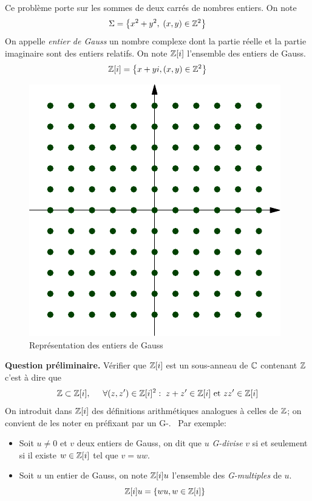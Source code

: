 Ce problème porte sur les sommes de deux carrés de nombres entiers. On note
\begin{displaymath}
  \Sigma = \left\lbrace x^2 + y^2,\; (x,y)\in \mathbb{Z}^2\right\rbrace 
\end{displaymath}
On appelle \emph{entier de Gauss} un nombre complexe dont la partie réelle et la partie imaginaire sont des entiers relatifs. On  note $\mathbb{Z}[i]$ l'ensemble des entiers de Gauss.
\begin{displaymath}
  \mathbb{Z}[i] = \left\lbrace x +yi, (x,y)\in \mathbb{Z}^2\right\rbrace 
\end{displaymath}
\begin{figure}[h]
  \centering
  \includegraphics{./Eari2car_1.pdf}
  \caption{Représentation des entiers de Gauss}
  \label{fig:Eari2car_1}
\end{figure}

\textbf{Question préliminaire.}\newline
Vérifier que $\mathbb{Z}[i]$ est un sous-anneau de $\mathbb{C}$ contenant $\mathbb{Z}$ c'est à dire que 
\begin{displaymath}
  \mathbb{Z} \subset \mathbb{Z}[i],\hspace{0.5cm} \forall(z,z')\in \mathbb{Z}[i]^2:\; z+z' \in \mathbb{Z}[i]\text{ et } zz'\in \mathbb{Z}[i]
\end{displaymath}
On introduit dans $\mathbb{Z}[i]$ des définitions arithmétiques analogues à celles de $\mathbb{Z}$; on convient de les noter en préfixant par un \og G-\fg.~ Par exemple:
\begin{itemize}
  \item Soit $u\neq 0$ et $v$ deux entiers de Gauss, on dit que $u$ \emph{G-divise} $v$ si et seulement si il existe $w\in \mathbb{Z}[i]$ tel que $v=uw$.
  \item Soit $u$ un entier de Gauss, on note $\mathbb{Z}[i]u$ l'ensemble des \emph{G-multiples} de $u$.
\begin{displaymath}
  \mathbb{Z}[i]u = \left\lbrace wu, w\in \mathbb{Z}[i] \right\rbrace 
\end{displaymath}  
\end{itemize}

